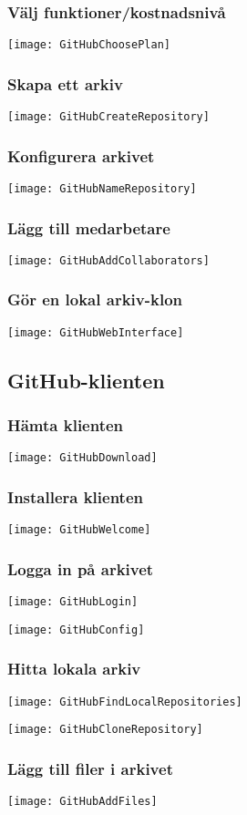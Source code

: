 \documentclass[swedish]{beamer}
\begin{document}
\begin{frame}
\frametitle{Välj funktioner/kostnadsnivå}
\texttt{[image: GitHubChoosePlan]}
\end{frame}


\begin{frame}
\frametitle{Skapa ett arkiv}
\texttt{[image: GitHubCreateRepository]}  
\end{frame}

\begin{frame}
\frametitle{Konfigurera arkivet}
\texttt{[image: GitHubNameRepository]}
\end{frame}

\begin{frame}
\frametitle{Lägg till medarbetare}
\texttt{[image: GitHubAddCollaborators]}
\end{frame}

\begin{frame}
\frametitle{Gör en lokal arkiv-klon}
\texttt{[image: GitHubWebInterface]}
\end{frame}

\subsection{GitHub-klienten}
\begin{frame}
\frametitle{Hämta klienten}
\texttt{[image: GitHubDownload]}

\end{frame}

\begin{frame}
\frametitle{Installera klienten}
\texttt{[image: GitHubWelcome]}
\end{frame}

\begin{frame}
\frametitle{Logga in på arkivet}
\texttt{[image: GitHubLogin]}
\end{frame}

\begin{frame}
\texttt{[image: GitHubConfig]}
\end{frame}

\begin{frame}
\frametitle{Hitta lokala arkiv}
\texttt{[image: GitHubFindLocalRepositories]}
\end{frame}


\begin{frame}
\texttt{[image: GitHubCloneRepository]}
\end{frame}

\begin{frame}
\frametitle{Lägg till filer i arkivet}
\texttt{[image: GitHubAddFiles]}
\end{frame}
\end{document}
